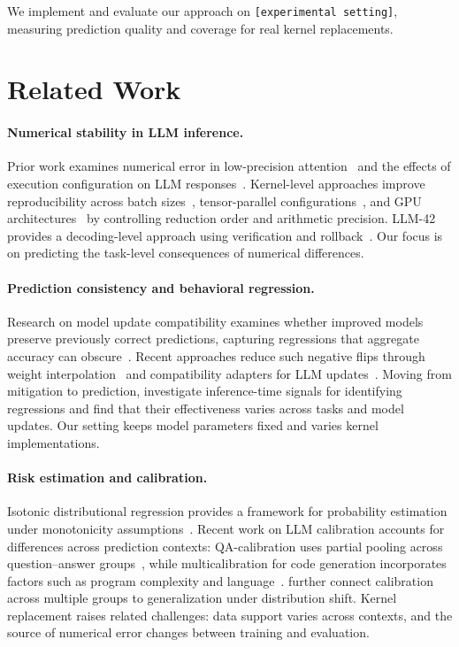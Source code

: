 \documentclass{article}
\begin{document}
We implement and evaluate our approach on \texttt{[experimental setting]}, measuring prediction quality and coverage for real kernel replacements.

\section{Related Work}

\paragraph{Numerical stability in LLM inference.}
Prior work examines numerical error in low-precision attention~\citep{shah2024flashattention3} and the effects of execution configuration on LLM responses~\citep{yuan2025numerical}.
Kernel-level approaches improve reproducibility across batch sizes~\citep{he2025nondeterminism}, tensor-parallel configurations~\citep{zhang2026deterministic}, and GPU architectures~\citep{cooper2026mitigation} by controlling reduction order and arithmetic precision.
LLM-42 provides a decoding-level approach using verification and rollback~\citep{gond2026llm42}.
Our focus is on predicting the task-level consequences of numerical differences.

\paragraph{Prediction consistency and behavioral regression.}
Research on model update compatibility examines whether improved models preserve previously correct predictions, capturing regressions that aggregate accuracy can obscure~\citep{yan2021positive}.
Recent approaches reduce such negative flips through weight interpolation~\citep{schumann2024backward} and compatibility adapters for LLM updates~\citep{echterhoff2024muscle}.
Moving from mitigation to prediction, \citet{sheng2026regression} investigate inference-time signals for identifying regressions and find that their effectiveness varies across tasks and model updates.
Our setting keeps model parameters fixed and varies kernel implementations.

\paragraph{Risk estimation and calibration.}
Isotonic distributional regression provides a framework for probability estimation under monotonicity assumptions~\citep{henzi2021isotonic}.
Recent work on LLM calibration accounts for differences across prediction contexts: QA-calibration uses partial pooling across question--answer groups~\citep{manggala2025qa}, while multicalibration for code generation incorporates factors such as program complexity and language~\citep{campos2025multicalibration}.
\citet{wu2024bridging} further connect calibration across multiple groups to generalization under distribution shift.
Kernel replacement raises related challenges: data support varies across contexts, and the source of numerical error changes between training and evaluation.
\end{document}

